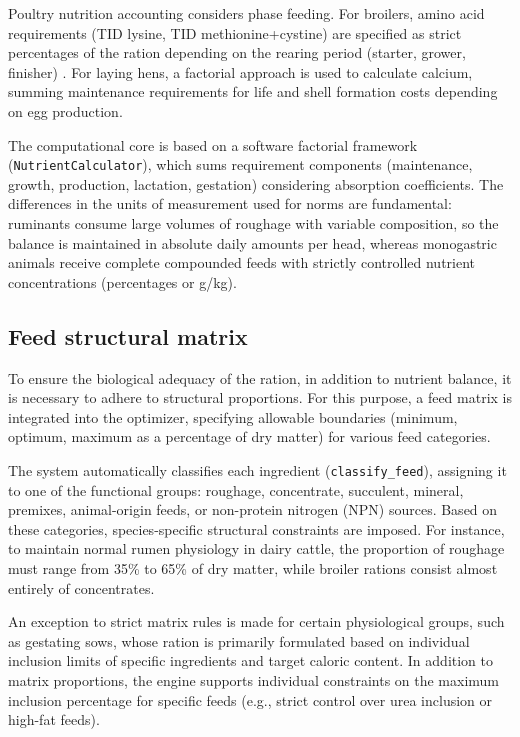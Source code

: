 \documentclass[a4paper,fleqn]{cas-dc}
\begin{document}
Poultry nutrition accounting considers phase feeding. For broilers, amino acid requirements (TID lysine, TID methionine+cystine) are specified as strict percentages of the ration depending on the rearing period (starter, grower, finisher) \citep{vnitip2017, nRC1994}. For laying hens, a factorial approach is used to calculate calcium, summing maintenance requirements for life and shell formation costs depending on egg production.

The computational core is based on a software factorial framework (\texttt{NutrientCalculator}), which sums requirement components (maintenance, growth, production, lactation, gestation) considering absorption coefficients. The differences in the units of measurement used for norms are fundamental: ruminants consume large volumes of roughage with variable composition, so the balance is maintained in absolute daily amounts per head, whereas monogastric animals receive complete compounded feeds with strictly controlled nutrient concentrations (percentages or g/kg).

\subsection{Feed structural matrix}\label{subsec:matrix}

To ensure the biological adequacy of the ration, in addition to nutrient balance, it is necessary to adhere to structural proportions. For this purpose, a feed matrix is integrated into the optimizer, specifying allowable boundaries (minimum, optimum, maximum as a percentage of dry matter) for various feed categories.

The system automatically classifies each ingredient (\texttt{classify\_feed}), assigning it to one of the functional groups: roughage, concentrate, succulent, mineral, premixes, animal-origin feeds, or non-protein nitrogen (NPN) sources. Based on these categories, species-specific structural constraints are imposed. For instance, to maintain normal rumen physiology in dairy cattle, the proportion of roughage must range from 35\% to 65\% of dry matter, while broiler rations consist almost entirely of concentrates.

An exception to strict matrix rules is made for certain physiological groups, such as gestating sows, whose ration is primarily formulated based on individual inclusion limits of specific ingredients and target caloric content. In addition to matrix proportions, the engine supports individual constraints on the maximum inclusion percentage for specific feeds (e.g., strict control over urea inclusion or high-fat feeds).
\end{document}
